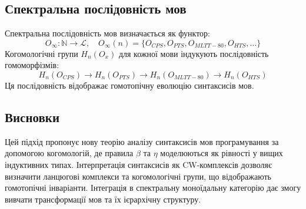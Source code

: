 \subsection{Спектральна послідовність мов}
Спектральна послідовність мов визначається як функтор:
\[
O_\infty: \mathbb{N} \to \mathcal{L}, \quad O_\infty(n) = \{O_{CPS}, O_{PTS}, O_{MLTT-80}, O_{HTS}, \dots\}
\]
Когомологічні групи \( H_n(O_x) \) для кожної мови індукують послідовність гомоморфізмів:
\[
H_n(O_{CPS}) \to H_n(O_{PTS}) \to H_n(O_{MLTT-80}) \to H_n(O_{HTS})
\]
Ця послідовність відображає гомотопічну еволюцію синтаксисів мов.

\subsection{Висновки}
Цей підхід пропонує нову теорію аналізу синтаксисів мов програмування за
допомогою когомологій, де правила \(\beta\) та \(\eta\) моделюються як
рівності у вищих індуктивних типах. Інтерпретація синтаксисів як CW-комплексів
дозволяє визначити ланцюгові комплекси та когомологічні групи, що відображають
гомотопічні інваріанти. Інтеграція в спектральну моноїдальну категорію дає змогу
вивчати трансформації мов та їх ієрархічну структуру.
